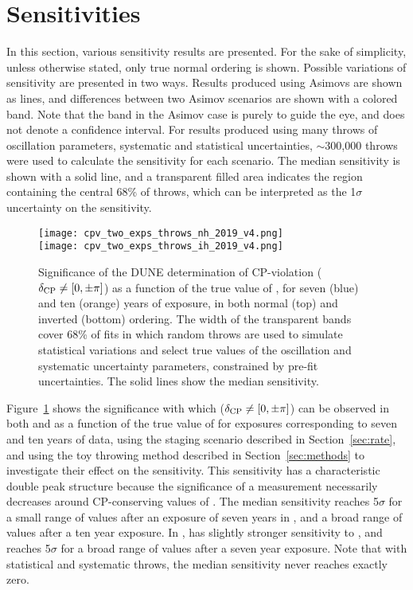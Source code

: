 \section{Sensitivities}
\label{sec:sens}

In this section, various sensitivity results are presented. For the sake of simplicity, unless otherwise stated, only true normal ordering is shown. Possible variations of sensitivity are presented in two ways. Results produced using Asimovs are shown as lines, and differences between two Asimov scenarios are shown with a colored band. Note that the band in the Asimov case is purely to guide the eye, and does not denote a confidence interval. For results produced using many throws of oscillation parameters, systematic and statistical uncertainties, $\sim$300,000 throws were used to calculate the sensitivity for each scenario. The median sensitivity is shown with a solid line, and a transparent filled area indicates the region containing the central 68\% of throws, which can be interpreted as the 1$\sigma$ uncertainty on the sensitivity.

\begin{figure}[htbp]
  \centering
  \texttt{[image: cpv\_two\_exps\_throws\_nh\_2019\_v4.png]}\\
  \texttt{[image: cpv\_two\_exps\_throws\_ih\_2019\_v4.png]}
  \caption[Significance of the DUNE determination of CP-violation as a function of \deltacp in both  and ]{Significance of the DUNE determination of CP-violation ($\delta_{\rm CP} \neq [0,\pm\pi]$) as a function of the true value of \deltacp, for seven (blue) and ten (orange) years of exposure, in both normal (top) and inverted (bottom) ordering. The width of the transparent bands cover 68\% of fits in which random throws are used to simulate statistical variations and select true values of the oscillation and systematic uncertainty parameters, constrained by pre-fit uncertainties. The solid lines show the median sensitivity.}
  \label{fig:cpv_nominal}
\end{figure}
Figure~\ref{fig:cpv_nominal} shows the significance with which  ($\delta_{\rm CP} \neq [0, \pm\pi]$) can be observed in both  and  as a
function of the true value of \deltacp for exposures corresponding to seven and ten years of data, using the staging scenario described in Section~\ref{sec:rate}, and using the toy throwing method described in Section~\ref{sec:methods} to investigate their effect on the sensitivity.
This sensitivity has a characteristic double peak
structure because the significance of a  measurement
necessarily decreases around CP-conserving values of \deltacp.
The median  sensitivity reaches 5$\sigma$ for a small range of values after an exposure of seven years in , and a broad range of values after a ten year exposure. In ,  has slightly stronger sensitivity to , and reaches 5$\sigma$ for a broad range of values after a seven year exposure.
Note that with statistical and systematic throws, the median sensitivity never reaches exactly zero.

